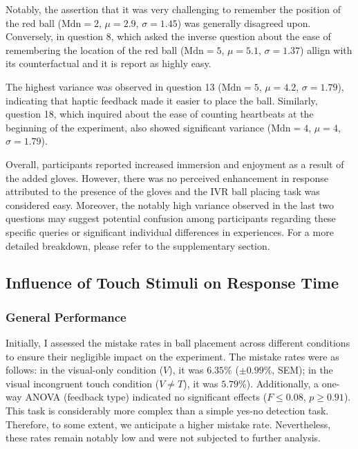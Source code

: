 \documentclass[12pt,oneside,openright]{report}
\begin{document}
Notably, the assertion that it was very challenging to remember the position of the red ball ($\text{Mdn} = 2$, $\mu = 2.9$, $\sigma = 1.45$) was generally disagreed upon. Conversely, in question 8, which asked the inverse question about the ease of remembering the location of the red ball ($\text{Mdn} = 5$, $\mu = 5.1$, $\sigma = 1.37$) allign with its counterfactual and it is report as highly easy. 
    
The highest variance was observed in question 13 ($\text{Mdn} = 5$, $\mu = 4.2$, $\sigma = 1.79$), indicating that haptic feedback made it easier to place the ball. Similarly, question 18, which inquired about the ease of counting heartbeats at the beginning of the experiment, also showed significant variance ($\text{Mdn} = 4$, $\mu = 4$, $\sigma = 1.79$). 
    
Overall, participants reported increased immersion and enjoyment as a result of the added gloves. However, there was no perceived enhancement in response attributed to the presence of the gloves and the IVR ball placing task was considered easy. Moreover, the notably high variance observed in the last two questions may suggest potential confusion among participants regarding these specific queries or significant individual differences in experiences. For a more detailed breakdown, please refer to the supplementary section.
    
\subsection*{Influence of Touch Stimuli on Response Time}
\subsubsection*{General Performance}

Initially, I assessed the mistake rates in ball placement across different conditions to ensure their negligible impact on the experiment. The mistake rates were as follows: in the visual-only condition ($V$), it was $6.35\%$ ($\pm 0.99\%$, SEM); in the visual incongruent touch condition ($V \neq T$), it was $5.79\%$). Additionally, a one-way ANOVA (feedback type) indicated no significant effects ($ F \leq 0.08$, $p \geq 0.91$). This task is considerably more complex than a simple yes-no detection task. Therefore, to some extent, we anticipate a higher mistake rate. Nevertheless, these rates remain notably low and were not subjected to further analysis.
\end{document}
